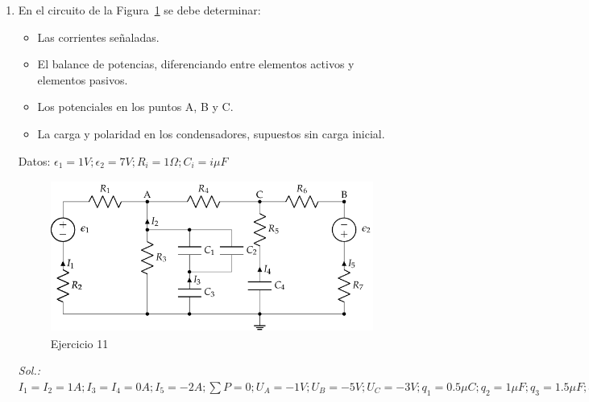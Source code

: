 \begin{enumerate}
\item En el circuito de la
  Figura~\ref{fig.mallas_agrupacion_condensadores} se debe determinar:
  \begin{itemize}
  \item Las corrientes señaladas.
  \item El balance de potencias, diferenciando entre elementos activos
    y elementos pasivos.
  \item Los potenciales en los puntos A, B y C.
  \item La carga y polaridad en los condensadores, supuestos sin carga
    inicial.
  \end{itemize}
  Datos:
  $\epsilon_1 ={1}V; \epsilon_2 ={7}V; R_i = {1}\Omega; C_i = {i}{\mu
    F}$
  \begin{figure}[H]
    \centering
    \includegraphics[height=5cm]{../figs/mallas_agrupacion_condensadores.pdf}
    \caption{Ejercicio 11}
    \label{fig.mallas_agrupacion_condensadores}
  \end{figure}
  \emph{Sol.:
    $I_1=I_2=1 A; I_3=I_4=0 A; I_5=-2 A; \sum P = 0; U_A=-1 V; U_B=-5
    V; U_C=-3 V; q_1=0.5 \mu C; q_2 = 1\mu F; q_3=1.5\mu F; q_4=12\mu
    C$}


\end{enumerate}
